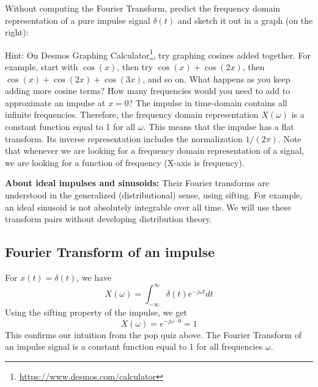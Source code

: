 \begin{popquiz}
  Without computing the Fourier Transform, predict the frequency domain representation of a pure impulse signal $\delta(t)$ and sketch it out in a graph (on the right):
  \begin{center}
  \end{center}

    Hint: On Desmos Graphing Calculator\footnote{\url{https://www.desmos.com/calculator}}, try graphing cosines added together. For example, start with $\cos(x)$, then try $\cos(x) + \cos(2x)$, then $\cos(x) + \cos(2x) + \cos(3x)$, and so on. What happens as you keep adding more cosine terms? How many frequencies would you need to add to approximate an impulse at $x=0$?
\popqsplit 
The impulse in time-domain contains all infinite frequencies. Therefore, the frequency domain representation $X(\omega)$ is a constant function equal to 1 for all $\omega$. This means that the impulse has a flat transform. Its inverse representation includes the normalization $1/(2\pi)$. Note that whenever we are looking for a frequency domain representation of a signal, we are looking for a function of frequency (X-axis is frequency).
\end{popquiz}

\textbf{About ideal impulses and sinusoids:} Their Fourier transforms are
understood in the generalized (distributional) sense, using sifting.
For example, an ideal sinusoid is not absolutely integrable over all time.
We will use these transform pairs without developing distribution theory.

\subsection{Fourier Transform of an impulse}
For $x(t) = \delta(t)$, we have
\begin{equation*}
    X(\omega) = \int_{-\infty}^{\infty} \delta(t) e^{-j\omega t} dt
\end{equation*}
Using the sifting property of the impulse, we get
\begin{equation*}
    X(\omega) = e^{-j\omega \cdot 0} = 1
\end{equation*}
This confirms our intuition from the pop quiz above. The Fourier Transform of an impulse signal is a constant function equal to 1 for all frequencies $\omega$.

